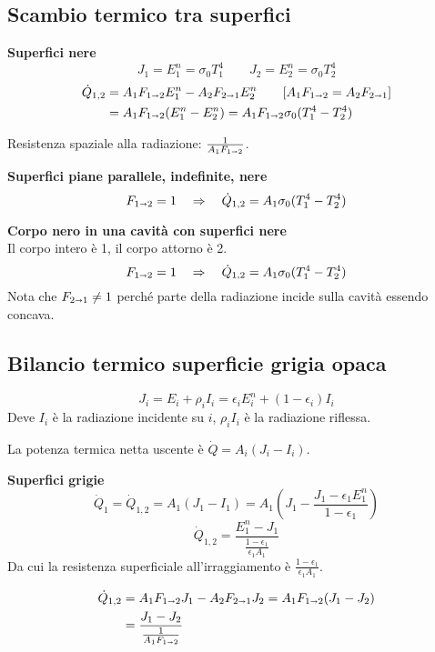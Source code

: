 \subsection{Scambio termico tra superfici}

\textbf{Superfici nere}\\
\[
    J_1 = E^n_1 = \sigma_0T_1^4 \qquad J_2 = E^n_2 = \sigma_0T_2^4
\]
\begin{align*}
    \dot{Q}_{1,2} &= A_1F_{1\shortrightarrow 2}E_1^n - A_2F_{2\shortrightarrow 1}E_2^n \qquad [A_1F_{1\shortrightarrow 2} = A_2F_{2\shortrightarrow 1}] \\
        &= A_1F_{1\shortrightarrow 2} (E_1^n - E_2^n) = A_1F_{1\shortrightarrow 2}\sigma_0(T_1^4 - T_2^4)
\end{align*}

Resistenza spaziale alla radiazione: $\frac{1}{A_1F_{1\shortrightarrow 2}}$.

\textbf{Superfici piane parallele, indefinite, nere}\\
\[
    F_{1\shortrightarrow 2} = 1 \quad \Rightarrow \quad \dot{Q}_{1,2} = A_1\sigma_0(T_1^4 - T_2^4)
\]

\textbf{Corpo nero in una cavità con superfici nere}\\
Il corpo intero è 1, il corpo attorno è 2.
\[
    F_{1\shortrightarrow 2} = 1 \quad \Rightarrow \quad \dot{Q}_{1,2} = A_1\sigma_0(T_1^4 - T_2^4)
\]
Nota che $F_{2\shortrightarrow 1} \ne 1$ perché parte della radiazione incide sulla cavità essendo concava.

\subsection{Bilancio termico superficie grigia opaca}
\[
    J_i = E_i + \rho_iI_i = \epsilon_iE_i^n + (1-\epsilon_i)I_i
\]
Deve $I_i$ è la radiazione incidente su $i$, $\rho_i I_i$ è la radiazione riflessa.

La potenza termica netta uscente è $\dot{Q} = A_i(J_i-I_i)$.

\textbf{Superfici grigie}\\
\[
    \dot{Q}_1 = \dot{Q}_{1,2} = A_1(J_1-I_1) = A_1\left(J_1-\frac{J_1-\epsilon_1E_1^n}{1-\epsilon_1}\right)
\]
\[
    \dot{Q}_{1,2} = \frac{E_1^n-J_1}{\frac{1-\epsilon_1}{\epsilon_1A_1}}
\]
Da cui la resistenza superficiale all'irraggiamento è $\frac{1-\epsilon_1}{\epsilon_1A_1}$.

\begin{align*}
    \dot{Q}_{1,2} &= A_1F_{1\shortrightarrow 2}J_1 - A_2F_{2\shortrightarrow 1}J_2 = A_1F_{1\shortrightarrow 2}(J_1-J_2) \\
        &= \frac{J_1-J_2}{\frac{1}{A_1F_{1\shortrightarrow 2}}}
\end{align*}

